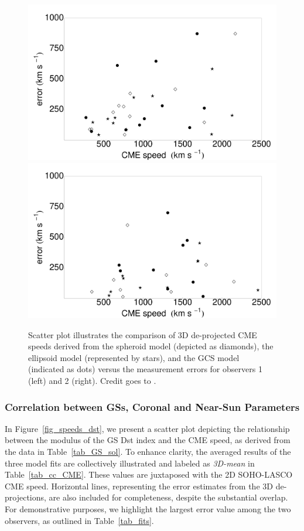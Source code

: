 \begin{figure}[!htp]
	\centering
	\includegraphics[width=0.48\hsize]{chapter2/figs/Fig_er_speed1.pdf}
	\includegraphics[width=0.48\hsize]{chapter2/figs/Fig_er_speed2.pdf}
	\caption{Scatter plot illustrates the comparison of 3D de-projected CME speeds derived from the spheroid model (depicted as diamonds), the ellipsoid model (represented by stars), and the GCS model (indicated as dots) versus the measurement errors for observers 1 (left) and 2 (right). Credit goes to \citet{miteva_2023}.}
	\label{fig_vcme_err}
\end{figure}

\subsubsection{Correlation between GSs, Coronal and Near-Sun Parameters}
In Figure~\ref{fig_speeds_dst}, we present a scatter plot depicting the relationship between the modulus of the GS Dst index and the CME speed, as derived from the data in Table~\ref{tab_GS_sol}. To enhance clarity, the averaged results of the three model fits are collectively illustrated and labeled as \textit{3D-mean} in Table~\ref{tab_cc_CME}. These values are juxtaposed with the 2D SOHO-LASCO CME speed. Horizontal lines, representing the error estimates from the 3D de-projections, are also included for completeness, despite the substantial overlap. For demonstrative purposes, we highlight the largest error value among the two observers, as outlined in Table~\ref{tab_fits}.

